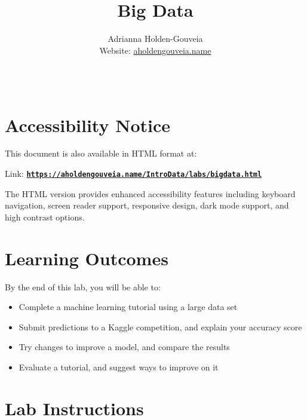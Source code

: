 \documentclass[12pt]{article}
\title{Big Data}
\author{
        Adrianna Holden-Gouveia \\
        Website: \href{https://aholdengouveia.name}{aholdengouveia.name}\\ 
        \date{\vspace{-5ex}}
        \faGithub {: aholdengouveia} \\
        }
\begin{document}
    

\maketitle



\section*{Accessibility Notice}
This document is also available in HTML format at:

Link: \href{https://aholdengouveia.name/IntroData/labs/bigdata.html}{\textbf{\nolinkurl{https://aholdengouveia.name/IntroData/labs/bigdata.html}}}

The HTML version provides enhanced accessibility features including keyboard navigation, screen reader support, responsive design, dark mode support, and high contrast options.

\section*{Learning Outcomes}
By the end of this lab, you will be able to:
\begin{itemize}
    \item Complete a machine learning tutorial using a large data set
    \item Submit predictions to a Kaggle competition, and explain your accuracy score
    \item Try changes to improve a model, and compare the results
    \item Evaluate a tutorial, and suggest ways to improve on it
\end{itemize}

\section*{Lab Instructions}
\end{document}
